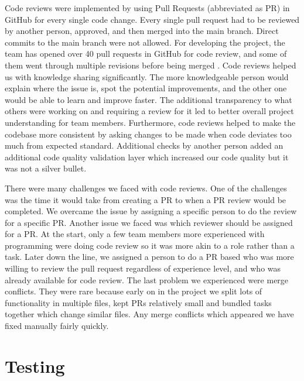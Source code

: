 Code reviews were implemented by using Pull Requests (abbreviated as PR) in GitHub for every single code change. Every single pull request had to be reviewed by another person, approved, and then merged into the main branch. Direct commits to the main branch were not allowed. For developing the project, the team has opened over 40 pull requests \cite{ghpr} in GitHub for code review, and some of them went through multiple revisions before being merged \cite{ghpr25}. Code reviews helped us with knowledge sharing significantly. The more knowledgeable person would explain where the issue is, spot the potential improvements, and the other one would be able to learn and improve faster. The additional transparency to what others were working on and requiring a review for it led to better overall project understanding for team members. Furthermore, code reviews helped to make the codebase more consistent by asking changes to be made when code deviates too much from expected standard. Additional checks by another person added an additional code quality validation layer which increased our code quality but it was not a silver bullet.\par

There were many challenges we faced with code reviews. One of the challenges was the time it would take from creating a PR to when a PR review would be completed. We overcame the issue by assigning a specific person to do the review for a specific PR. Another issue we faced was which reviewer should be assigned for a PR. At the start, only a few team members more experienced with programming were doing code review so it was more akin to a role rather than a task. Later down the line, we assigned a person to do a PR based who was more willing to review the pull request regardless of experience level, and who was already available for code review. The last problem we experienced were merge conflicts. They were rare because early on in the project we split lots of functionality in multiple files, kept PRs relatively small and bundled tasks together which change similar files. Any merge conflicts which appeared we have fixed manually fairly quickly.\par

\section{Testing}


